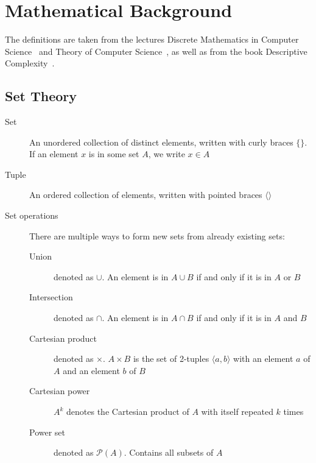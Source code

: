 \chapter{Mathematical Background}\label{ch:mathematical-background}

The definitions are taken from the lectures Discrete Mathematics in Computer Science~\cite{discrete-maths} and Theory of Computer Science~\cite{theory-cs}, as well as from the book Descriptive Complexity~\cite{descriptive-complexity}.


\section{Set Theory}\label{sec:set-theory}
\begin{description}
    \item[Set] An unordered collection of distinct elements, written with curly braces $\{\}$.
    If an element $x$ is in some set $A$, we write $x \in A$
    \item[Tuple] An ordered collection of elements, written with pointed braces $\langle  \rangle$
    \item[Set operations] There are multiple ways to form new sets from already existing sets:
    \begin{description}
        \item[Union] denoted as $\cup$.
        An element is in $A \cup B$ if and only if it is in $A$ or $B$
        \item[Intersection] denoted as $\cap$.
        An element is in $A \cap B$ if and only if it is in $A$ and $B$
        \item[Cartesian product] denoted as $\times$. $A \times B$ is the set of 2-tuples $\langle a, b\rangle$ with an element $a$ of $A$ and an element $b$ of $B$
        \item[Cartesian power] $A^k$ denotes the Cartesian product of $A$ with itself repeated $k$ times
        \item[Power set] denoted as $\mathcal{P}(A)$.
        Contains all subsets of $A$
    \end{description}
\end{description}



